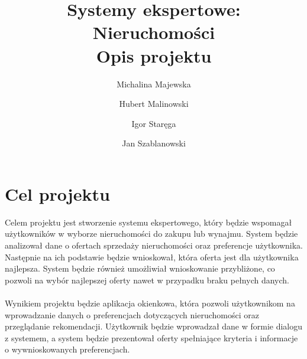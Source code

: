 \documentclass{article}
\title{Systemy ekspertowe: Nieruchomości \\ \large{Opis projektu}}
\author{Michalina Majewska
	\and Hubert Malinowski
	\and Igor Staręga
	\and Jan Szablanowski}
\begin{document}
\maketitle
\tableofcontents

\vspace{2cm}

\section{Cel projektu}
Celem projektu jest stworzenie systemu ekspertowego, który będzie wspomagał użytkowników w wyborze nieruchomości do zakupu lub wynajmu. System będzie analizował dane o ofertach sprzedaży nieruchomości oraz preferencje użytkownika. Następnie na ich podstawie będzie wnioskował, która oferta jest dla użytkownika najlepsza. System będzie również umożliwiał wnioskowanie przybliżone, co pozwoli na wybór najlepszej oferty nawet w przypadku braku pełnych danych.
\\ \\
Wynikiem projektu będzie aplikacja okienkowa, która pozwoli użytkownikom na wprowadzanie danych o preferencjach dotyczących nieruchomości oraz przeglądanie rekomendacji. Użytkownik będzie wprowadzał dane w formie dialogu z systemem, a system będzie prezentował oferty spełniające kryteria i informacje o wywnioskowanych preferencjach.




\end{document}
